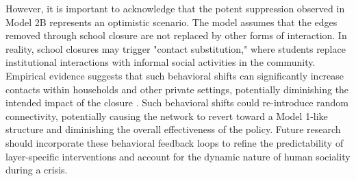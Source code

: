 However, it is important to acknowledge that the potent suppression observed in Model 2B represents an optimistic scenario.
The model assumes that the edges removed through school closure are not replaced by other forms of interaction.
In reality, school closures may trigger "contact substitution," where students replace institutional interactions with informal social activities in the community.
Empirical evidence suggests that such behavioral shifts can significantly increase contacts within households and other private settings, potentially diminishing the intended impact of the closure \parencite{litvinova2019reactive}.
Such behavioral shifts could re-introduce random connectivity, potentially causing the network to revert toward a Model 1-like structure and diminishing the overall effectiveness of the policy.
Future research should incorporate these behavioral feedback loops to refine the predictability of layer-specific interventions and account for the dynamic nature of human sociality during a crisis.